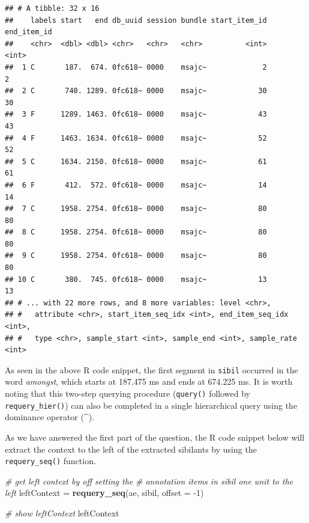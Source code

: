 \documentclass[]{book}
\newenvironment{Shaded}{\begin{snugshade}}{\end{snugshade}}
\newcommand{\CommentTok}[1]{\textcolor[rgb]{0.56,0.35,0.01}{\textit{#1}}}
\newcommand{\DataTypeTok}[1]{\textcolor[rgb]{0.13,0.29,0.53}{#1}}
\newcommand{\DecValTok}[1]{\textcolor[rgb]{0.00,0.00,0.81}{#1}}
\newcommand{\KeywordTok}[1]{\textcolor[rgb]{0.13,0.29,0.53}{\textbf{#1}}}
\newcommand{\NormalTok}[1]{#1}
\newcommand{\StringTok}[1]{\textcolor[rgb]{0.31,0.60,0.02}{#1}}
\begin{document}
\begin{verbatim}
## # A tibble: 32 x 16
##    labels start   end db_uuid session bundle start_item_id end_item_id
##    <chr>  <dbl> <dbl> <chr>   <chr>   <chr>          <int>       <int>
##  1 C       187.  674. 0fc618~ 0000    msajc~             2           2
##  2 C       740. 1289. 0fc618~ 0000    msajc~            30          30
##  3 F      1289. 1463. 0fc618~ 0000    msajc~            43          43
##  4 F      1463. 1634. 0fc618~ 0000    msajc~            52          52
##  5 C      1634. 2150. 0fc618~ 0000    msajc~            61          61
##  6 F       412.  572. 0fc618~ 0000    msajc~            14          14
##  7 C      1958. 2754. 0fc618~ 0000    msajc~            80          80
##  8 C      1958. 2754. 0fc618~ 0000    msajc~            80          80
##  9 C      1958. 2754. 0fc618~ 0000    msajc~            80          80
## 10 C       380.  745. 0fc618~ 0000    msajc~            13          13
## # ... with 22 more rows, and 8 more variables: level <chr>,
## #   attribute <chr>, start_item_seq_idx <int>, end_item_seq_idx <int>,
## #   type <chr>, sample_start <int>, sample_end <int>, sample_rate <int>
\end{verbatim}

As seen in the above R code snippet, the first segment in \texttt{sibil} occurred in the word \emph{amongst}, which starts at 187.475 ms and ends at 674.225 ms. It is worth noting that this two-step querying procedure (\texttt{query()} followed by \texttt{requery\_hier()}) can also be completed in a single hierarchical query using the dominance operator (\^{}).

As we have answered the first part of the question, the R code snippet below will extract the context to the left of the extracted sibilants by using the \texttt{requery\_seq()} function.

\begin{Shaded}
\begin{Highlighting}[]
\CommentTok{# get left context by off setting the }
\CommentTok{# annotation items in sibil one unit to the left}
\NormalTok{leftContext =}\StringTok{ }\KeywordTok{requery_seq}\NormalTok{(ae, sibil, }\DataTypeTok{offset =} \DecValTok{-1}\NormalTok{)}

\CommentTok{# show leftContext}
\NormalTok{leftContext}
\end{Highlighting}
\end{Shaded}
\end{document}
